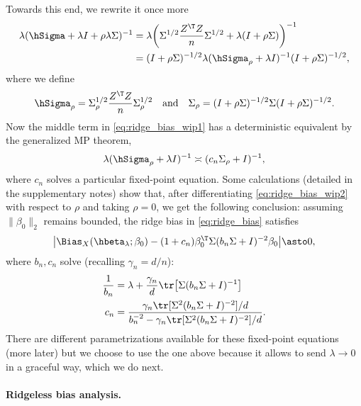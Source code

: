 \documentclass{article}
\begin{document}
Towards this end, we rewrite it once more
\begin{align}
\nonumber
\lambda (\hSigma + \lambda I + \rho \lambda \Sigma)^{-1} 
&= \lambda \bigg( \Sigma^{1/2} \frac{Z^\T Z}{n} \Sigma^{1/2} + 
  \lambda (I + \rho \Sigma) \bigg)^{-1} \\
\label{eq:ridge_bias_wip1} 
&= (I + \rho \Sigma)^{-1/2} \lambda (\hSigma_\rho + \lambda I)^{-1} 
  (I + \rho \Sigma)^{-1/2},
\end{align}
where we define
\[
\hSigma_\rho = \Sigma_\rho^{1/2} \frac{Z^\T Z}{n} \Sigma_\rho^{1/2} 
\quad \text{and} \quad 
\Sigma_\rho = (I + \rho \Sigma)^{-1/2} \Sigma (I + \rho \Sigma)^{-1/2}. 
\]
Now the middle term in \eqref{eq:ridge_bias_wip1} has a deterministic equivalent 
by the generalized MP theorem,  
\begin{equation}
\label{eq:ridge_bias_wip2}
\lambda (\hSigma_\rho + \lambda I)^{-1} \asymp (c_n\Sigma_\rho + I)^{-1},
\end{equation}
where $c_n$ solves a particular fixed-point equation. Some calculations
(detailed in the supplementary notes) show that, after differentiating
\eqref{eq:ridge_bias_wip2} with respect to $\rho$ and taking $\rho=0$, we get 
the following conclusion: assuming $\|\beta_0\|_2$ remains bounded, the ridge
bias in \eqref{eq:ridge_bias} satisfies
\begin{equation}
\label{eq:ridge_bias_limit}
\big| \Bias_X(\hbeta_\lambda; \beta_0) - (1+c_n) \beta_0^\T \Sigma (b_n \Sigma + 
I)^{-2} \beta_0 \big| \asto 0, 
\end{equation}
where $b_n,c_n$ solve (recalling $\gamma_n = d/n$): 
\begin{align}
\label{eq:ridge_bn}
\frac{1}{b_n} &= \lambda + \frac{\gamma_n}{d} \tr \big[ \Sigma (b_n \Sigma +
  I)^{-1} \big]\\  
\label{eq:ridge_cn}
c_n &= \frac{\gamma_n \tr [ \Sigma^2 (b_n \Sigma + I)^{-2} ] / d}
{b_n^{-2} - \gamma_n \tr [ \Sigma^2 (b_n \Sigma + I)^{-2} ] / d}.
\end{align}
There are different parametrizations available for these fixed-point equations
(more later) but we choose to use the one above because it allows to send
$\lambda \to 0$ in a graceful way, which we do next.

\paragraph{Ridgeless bias analysis.}
\end{document}
